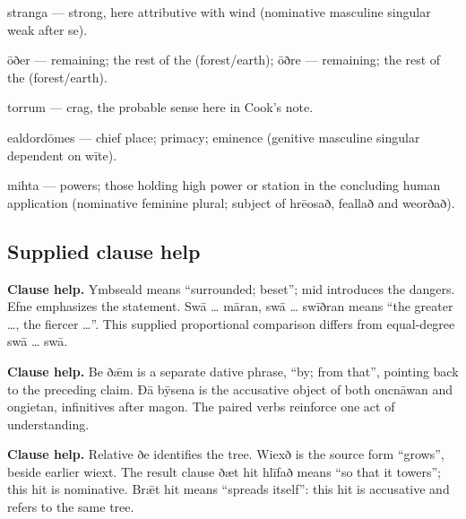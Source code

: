 stranga — strong, here attributive with wind (nominative masculine singular weak after se).

ōðer — remaining; the rest of the (forest/\allowbreak{}earth); ōðre — remaining; the rest of the (forest/\allowbreak{}earth).

torrum — crag, the probable sense here in Cook’s note.

ealdordōmes — chief place; primacy; eminence (genitive masculine singular dependent on wīte).

mihta — powers; those holding high power or station in the concluding human application (nominative feminine plural; subject of hrēosað, feallað and weorðað).

\subsection*{Supplied clause help}

\textbf{Clause help.} Ymbseald means “surrounded; beset”; mid introduces the dangers. Efne emphasizes the statement. Swā … māran, swā … swīðran means “the greater …, the fiercer …”. This supplied proportional comparison differs from equal-degree swā … swā.

\textbf{Clause help.} Be ðǣm is a separate dative phrase, “by; from that”, pointing back to the preceding claim. Ðā bȳsena is the accusative object of both oncnāwan and ongietan, infinitives after magon. The paired verbs reinforce one act of understanding.

\textbf{Clause help.} Relative ðe identifies the tree. Wiexð is the source form “grows”, beside earlier wiext. The result clause ðæt hit hlīfað means “so that it towers”; this hit is nominative. Brǣt hit means “spreads itself”: this hit is accusative and refers to the same tree.

